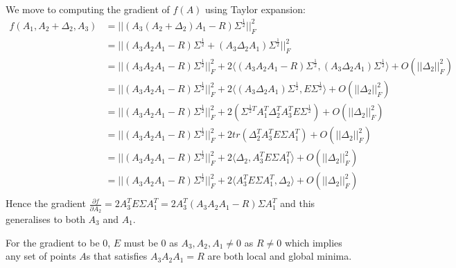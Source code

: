 \documentclass[12pt]{article}
\begin{document}
 We move to computing the gradient of $f(A)$ using Taylor expansion:
 \begin{align*}
 f(A_1, A_2 + \Delta_2, A_3)
 &= ||(A_3(A_2+\Delta_2)A_1 - R)\Sigma^{\frac{1}{2}}||_F^2 \\
 &= ||(A_3 A_2 A_1 - R)\Sigma^{\frac{1}{2}} + (A_3 \Delta_2 A_1)\Sigma^{\frac{1}{2}}||_F^2 \\
 &= ||(A_3 A_2 A_1 - R)\Sigma^{\frac{1}{2}}||_F^2 + 2 \langle (A_3 A_2 A_1 - R)\Sigma^{\frac{1}{2}}, (A_3 \Delta_2A_1)\Sigma^{\frac{1}{2}} \rangle + O(||\Delta_2||_F^2) \\
 &= ||(A_3 A_2 A_1 - R)\Sigma^{\frac{1}{2}}||_F^2 + 2 \langle (A_3 \Delta_2 A_1)\Sigma^{\frac{1}{2}}, E\Sigma^{\frac{1}{2}} \rangle + O(||\Delta_2||_F^2)\\
 &= ||(A_3 A_2 A_1 - R)\Sigma^{\frac{1}{2}}||_F^2 + 2 (\Sigma^{\frac{1}{2}T} A_1^T \Delta_2^T A_3^T E\Sigma^{\frac{1}{2}}) + O(||\Delta_2||_F^2)\\
 &= ||(A_3 A_2 A_1 - R)\Sigma^{\frac{1}{2}}||_F^2 + 2 tr(\Delta_2^T A_3^T E\Sigma A_1^T) + O(||\Delta_2||_F^2)\\
 &= ||(A_3 A_2 A_1 - R)\Sigma^{\frac{1}{2}}||_F^2 + 2 \langle \Delta_2, A_3^T E\Sigma A_1^T \rangle + O(||\Delta_2||_F^2)\\
 &= ||(A_3 A_2 A_1 - R)\Sigma^{\frac{1}{2}}||_F^2 + 2 \langle A_3^T E\Sigma A_1^T, \Delta_2 \rangle + O(||\Delta_2||_F^2)\\
 \end{align*}
 Hence the gradient $\frac{\partial f}{\partial A_2} = 2 A_3^T E\Sigma A_1^T = 2 A_3^T (A_3 A_2 A_1 - R)\Sigma A_1^T$ and this generalises to both $A_3$ and $A_1$.
 
For the gradient to be 0, $E$ must be 0 as $A_3, A_2, A_1 \neq 0$ as $R \neq 0$ which implies any set of points $A$s that satisfies $A_3 A_2 A_1 = R$ are both local and global minima.

\end{document}
